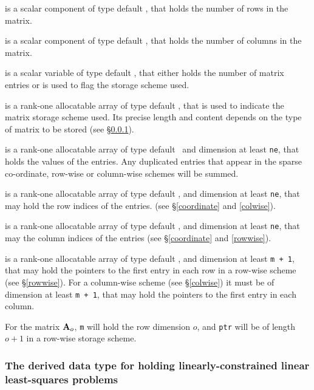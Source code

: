 \documentclass{galahad}
\begin{document}
\begin{description}

 is a scalar component of type default \integer,
that holds the number of rows in the matrix.

 is a scalar component of type default \integer,
that holds the number of columns in the matrix.

 is a scalar variable of type default \integer, that either
holds the number of matrix entries or is used to flag the storage scheme
used.

 is a rank-one allocatable array of type default \character, that
is used to indicate the matrix storage scheme used. Its precise length and
content depends on the type of matrix to be stored (see \S\ref{typeqp}).

 is a rank-one allocatable array of type default \realdp\,
and dimension at least {\tt ne}, that holds the values of the entries.
Any duplicated entries that appear in the sparse
co-ordinate, row-wise or column-wise schemes will be summed.

 is a rank-one allocatable array of type default \integer,
and dimension at least {\tt ne}, that may hold the row indices of the entries.
(see \S\ref{coordinate} and \ref{colwise}).

 is a rank-one allocatable array of type default \integer,
and dimension at least {\tt ne}, that may the column indices of the entries
(see \S\ref{coordinate} and \ref{rowwise}).

 is a rank-one allocatable array of type default \integer,
and dimension at least {\tt m + 1}, that may hold the pointers to
the first entry in each row in a row-wise scheme (see \S\ref{rowwise}).
For a column-wise scheme (see \S\ref{colwise}) it must be of
dimension at least {\tt m + 1}, that may hold the pointers to
the first entry in each column.

\end{description}
For the matrix ${\mathbf{A}}_o$, {\tt m} will hold the row dimension $o$, and
{\tt ptr} will be of length $o+1$ in a row-wise storage scheme.



\subsubsection{The derived data type for holding linearly-constrained linear least-squares problems}
\label{typeqp}
\end{document}
